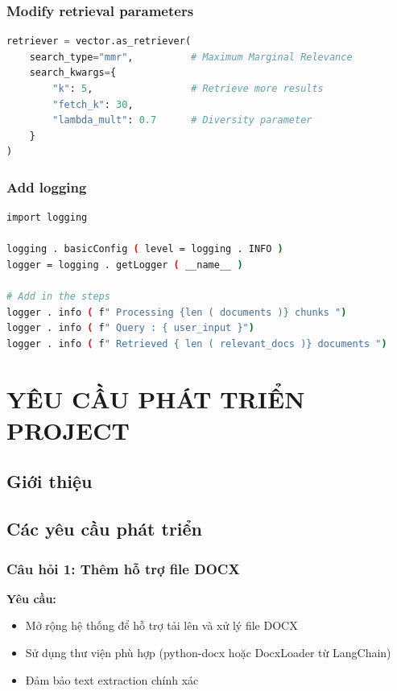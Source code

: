 \documentclass[a4paper]{article}
\begin{document}
\subsubsection{Modify retrieval parameters}
\begin{lstlisting}[language=Python]
retriever = vector.as_retriever(
    search_type="mmr",          # Maximum Marginal Relevance
    search_kwargs={
        "k": 5,                 # Retrieve more results
        "fetch_k": 30,
        "lambda_mult": 0.7      # Diversity parameter
    }
)
\end{lstlisting}
\subsubsection{Add logging}
\begin{lstlisting}[language=bash]
import logging

logging . basicConfig ( level = logging . INFO )
logger = logging . getLogger ( __name__ )

# Add in the steps
logger . info ( f" Processing {len ( documents )} chunks ")
logger . info ( f" Query : { user_input }")
logger . info ( f" Retrieved { len ( relevant_docs )} documents ")
\end{lstlisting}
\newpage
\section{YÊU CẦU PHÁT TRIỂN PROJECT} %
\subsection{Giới thiệu}
\subsection{Các yêu cầu phát triển}
\subsubsection{Câu hỏi 1: Thêm hỗ trợ file DOCX}
\textbf{Yêu cầu:}
\begin{itemize}
    \item Mở rộng hệ thống để hỗ trợ tải lên và xử lý file DOCX
    \item Sử dụng thư viện phù hợp (python-docx hoặc DocxLoader từ LangChain)
    \item Đảm bảo text extraction chính xác
\end{itemize}
\end{document}
